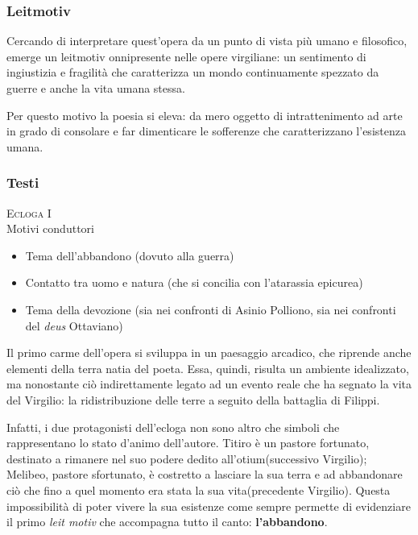 \documentclass[10pt,a4paper]{article}
\begin{document}
	\subsubsection*{Leitmotiv}
	
	Cercando di interpretare quest'opera da un punto di vista più umano e filosofico, emerge un leitmotiv onnipresente nelle opere virgiliane: un sentimento di ingiustizia e fragilità che caratterizza un mondo continuamente spezzato da guerre e anche la vita umana stessa. 
	
	Per questo motivo la poesia si eleva: da mero oggetto di intrattenimento ad arte in grado di consolare e far dimenticare le sofferenze che caratterizzano l'esistenza umana. 
	
	\subsubsection*{Testi}
	
	\textsc{Ecloga I}\\
	
	Motivi conduttori
	
	\begin{itemize}
		\item Tema dell'abbandono (dovuto alla guerra)
		\item Contatto tra uomo e natura (che si concilia con l'atarassia epicurea)
		\item Tema della devozione (sia nei confronti di Asinio Polliono, sia nei confronti del \textit{deus} Ottaviano)
	\end{itemize}
	
	Il primo carme dell'opera si sviluppa in un paesaggio arcadico, che riprende anche elementi della terra natia del poeta. Essa, quindi, risulta un ambiente idealizzato, ma nonostante ciò indirettamente legato ad un evento reale che ha segnato la vita del Virgilio: la ridistribuzione delle terre a seguito della battaglia di Filippi.
	
	Infatti, i due protagonisti dell'ecloga non sono altro che simboli che rappresentano lo stato d'animo dell'autore. Titiro è un pastore fortunato, destinato a rimanere nel suo podere dedito all'otium(successivo Virgilio); Melibeo, pastore sfortunato, è costretto a lasciare la sua terra e ad abbandonare ciò che fino a quel momento era stata la sua vita(precedente Virgilio). Questa impossibilità di poter vivere la sua esistenze come sempre permette di evidenziare il primo \textit{leit motiv} che accompagna tutto il canto: \textbf{l'abbandono}.
	
\end{document}
